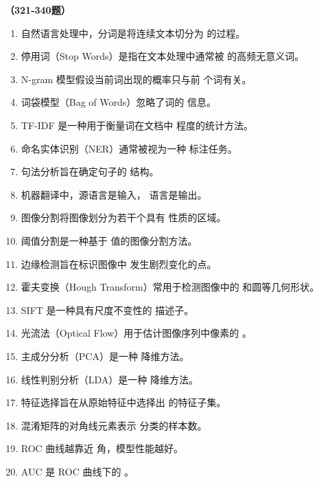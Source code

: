 \vspace{1em}
\textbf{（321-340题）}
\begin{enumerate}[resume,leftmargin=2em,itemsep=1pt]
\item 自然语言处理中，分词是将连续文本切分为 \underline{\hspace{3em}} 的过程。
\item 停用词（Stop Words）是指在文本处理中通常被 \underline{\hspace{3em}} 的高频无意义词。
\item N-gram 模型假设当前词出现的概率只与前 \underline{\hspace{3em}} 个词有关。
\item 词袋模型（Bag of Words）忽略了词的 \underline{\hspace{3em}} 信息。
\item TF-IDF 是一种用于衡量词在文档中 \underline{\hspace{3em}} 程度的统计方法。
\item 命名实体识别（NER）通常被视为一种 \underline{\hspace{3em}} 标注任务。
\item 句法分析旨在确定句子的 \underline{\hspace{3em}} 结构。
\item 机器翻译中，源语言是输入，\underline{\hspace{3em}} 语言是输出。
\item 图像分割将图像划分为若干个具有 \underline{\hspace{3em}} 性质的区域。
\item 阈值分割是一种基于 \underline{\hspace{3em}} 值的图像分割方法。
\item 边缘检测旨在标识图像中 \underline{\hspace{3em}} 发生剧烈变化的点。
\item 霍夫变换（Hough Transform）常用于检测图像中的 \underline{\hspace{3em}} 和圆等几何形状。
\item SIFT 是一种具有尺度不变性的 \underline{\hspace{3em}} 描述子。
\item 光流法（Optical Flow）用于估计图像序列中像素的 \underline{\hspace{3em}}。
\item 主成分分析（PCA）是一种 \underline{\hspace{3em}} 降维方法。
\item 线性判别分析（LDA）是一种 \underline{\hspace{3em}} 降维方法。
\item 特征选择旨在从原始特征中选择出 \underline{\hspace{3em}} 的特征子集。
\item 混淆矩阵的对角线元素表示 \underline{\hspace{3em}} 分类的样本数。
\item ROC 曲线越靠近 \underline{\hspace{3em}} 角，模型性能越好。
\item AUC 是 ROC 曲线下的 \underline{\hspace{3em}}。
\end{enumerate}


